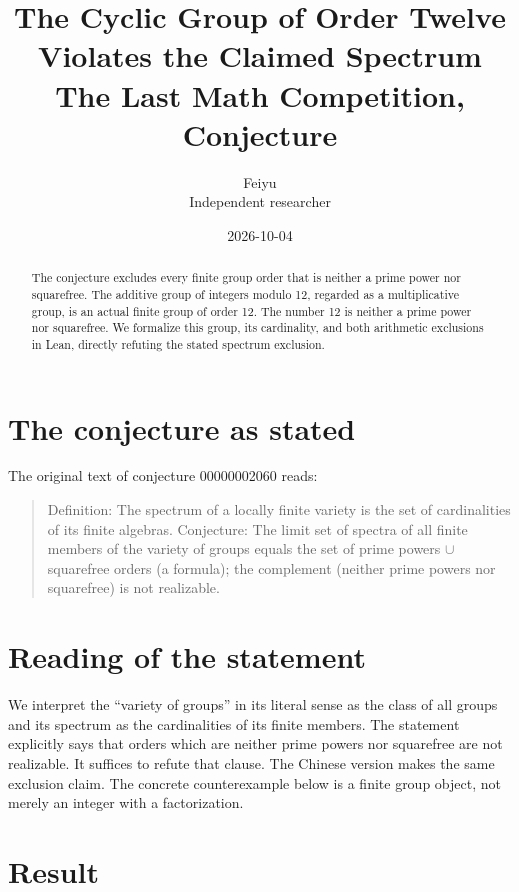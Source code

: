 \documentclass[11pt]{article}
\title{The Cyclic Group of Order Twelve Violates the Claimed Spectrum\\[0.4em]\large The Last Math Competition, Conjecture \conjid}
\author{Feiyu\\ \small Independent researcher}
\date{2026-10-04}
\theoremstyle{plain}
\theoremstyle{definition}
\theoremstyle{remark}
\newcommand{\conjid}{00000002060}
\begin{document}
\maketitle

\begin{abstract}
The conjecture excludes every finite group order that is neither a prime power nor squarefree. The additive group of integers modulo 12, regarded as a multiplicative group, is an actual finite group of order 12. The number 12 is neither a prime power nor squarefree. We formalize this group, its cardinality, and both arithmetic exclusions in Lean, directly refuting the stated spectrum exclusion.
\end{abstract}

\section{The conjecture as stated}

The original text of conjecture \conjid{} reads:

\begin{quote}
Definition: The spectrum of a locally finite variety is the set of cardinalities of its finite algebras. Conjecture: The limit set of spectra of all finite members of the variety of groups equals the set of prime powers $\cup$ squarefree orders (a formula); the complement (neither prime powers nor squarefree) is not realizable.
\end{quote}

\section{Reading of the statement}


We interpret the ``variety of groups'' in its literal sense as the class of all groups and its spectrum as the cardinalities of its finite members. The statement explicitly says that orders which are neither prime powers nor squarefree are not realizable. It suffices to refute that clause. The Chinese version makes the same exclusion claim. The concrete counterexample below is a finite group object, not merely an integer with a factorization.

\section{Result}
\end{document}
